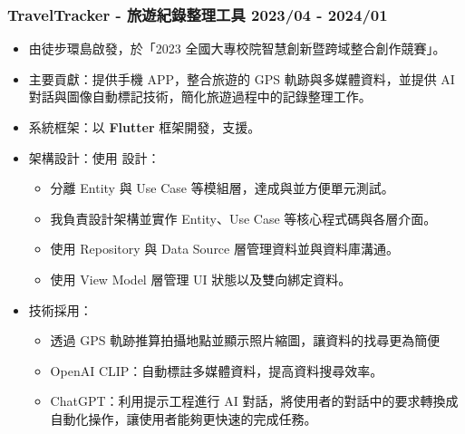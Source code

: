 \subsubsection*{TravelTracker - 旅遊紀錄整理工具 \hfill 2023/04 - 2024/01}
\begin{itemize}
    \item 由徒步環島啟發，於「2023 全國大專校院智慧創新暨跨域整合創作競賽」。
    \item 主要貢獻：提供手機 APP，整合旅遊的 GPS 軌跡與多媒體資料，並提供 AI 對話與圖像自動標記技術，簡化旅遊過程中的記錄整理工作。
    \item 系統框架：以 \textbf{Flutter} 框架開發，支援。
    \item 架構設計：使用  設計：
    \begin{itemize}
        \item 分離 Entity 與 Use Case 等模組層，達成與並方便單元測試。
        \item 我負責設計架構並實作 Entity、Use Case 等核心程式碼與各層介面。
        \item 使用 Repository 與 Data Source 層管理資料並與資料庫溝通。
        \item 使用 View Model 層管理 UI 狀態以及雙向綁定資料。
    \end{itemize}
    \item 技術採用：
    \begin{itemize}
        \item 透過 GPS 軌跡推算拍攝地點並顯示照片縮圖，讓資料的找尋更為簡便
        \item OpenAI CLIP：自動標註多媒體資料，提高資料搜尋效率。
        \item ChatGPT：利用提示工程進行 AI 對話，將使用者的對話中的要求轉換成自動化操作，讓使用者能夠更快速的完成任務。
    \end{itemize}
\end{itemize}


